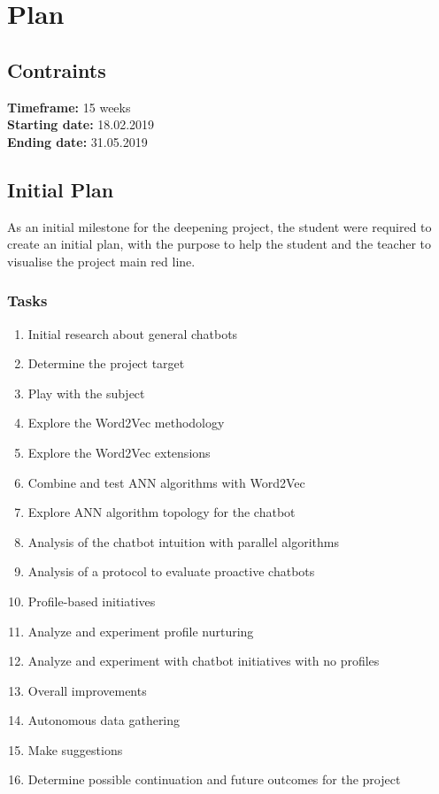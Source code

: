\chapter{Plan}


\section{Contraints}
\textbf{Timeframe:} 15 weeks\\
\textbf{Starting date:} 18.02.2019\\
\textbf{Ending date:} 31.05.2019

\section{Initial Plan}
As an initial milestone for the deepening project, the student were required to create an initial plan, with the purpose to help the student and the teacher to visualise the project main red line.
\subsection{Tasks}
\begin{enumerate}
	\setlength\itemsep{0em}
	\item Initial research about general chatbots
	\item Determine the project target
	\item Play with the subject
	\item Explore the Word2Vec methodology
	\item Explore the Word2Vec extensions
	\item Combine and test ANN algorithms with Word2Vec
	\item Explore ANN algorithm topology for the chatbot
	\item Analysis of the chatbot intuition with parallel algorithms
	\item Analysis of a protocol to evaluate proactive chatbots
	\item Profile-based initiatives
	\item Analyze and experiment profile nurturing 
	\item Analyze and experiment with chatbot initiatives with no profiles
	\item Overall improvements
	\item Autonomous data gathering
	\item Make suggestions
	\item Determine possible continuation and future outcomes for the project
\end{enumerate}

